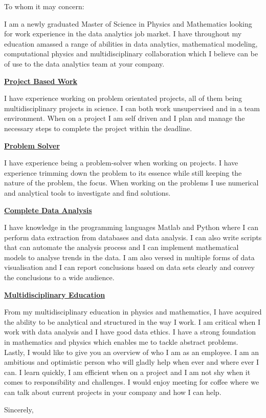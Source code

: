 \documentclass[10pt,a4paper]{letter}
\begin{document}
\begin{letter}{}
\opening{To whom it may concern:}
I am a newly graduated Master of Science in Physics and Mathematics looking for work experience in the data analytics job market. I have throughout my education amassed a range of abilities in data analytics, mathematical modeling, computational physics and multidisciplinary collaboration which I believe can be of use to the data analytics team at your company. 

\underline{\textbf{Project Based Work}}

I have experience working on problem orientated projects, all of them being multidisciplinary projects in science. I can both work unsupervised and in a team environment. When on a project I am self driven and I plan and manage the necessary steps to complete the project within the deadline.  

 
\underline{\textbf{Problem Solver}}

I have experience being a problem-solver when working on projects. I have experience trimming down the problem to its essence while still keeping the nature of the problem, the focus. When working on the problems I use numerical and analytical tools to investigate and find solutions.   


\underline{\textbf{Complete Data Analysis}}

I have knowledge in the programming languages Matlab and Python where I can perform data extraction from databases and data analysis. I can also write scripts that can automate the analysis process and I can implement mathematical models to analyse trends in the data. I am also versed in multiple forms of data visualisation and I can report conclusions based on data sets clearly and convey the conclusions to a wide audience.


\underline{\textbf{Multidisciplinary Education}}

From my multidisciplinary education in physics and mathematics, I have acquired the ability to be analytical and structured in the way I work. I am critical when I work with data analysis and I have good data ethics. I have a strong foundation in mathematics and physics which enables me to tackle abstract problems.
\\

Lastly, I would like to give you an overview of who I am as an employee. I am an ambitious and optimistic person who will gladly help when ever and where ever I can. I learn quickly, I am efficient when on a project and I am not shy when it comes to responsibility and challenges. I would enjoy meeting for coffee where we can talk about current projects in your company and how I can help.   
   



   

\closing{Sincerely,}

\end{letter}
\end{document}
